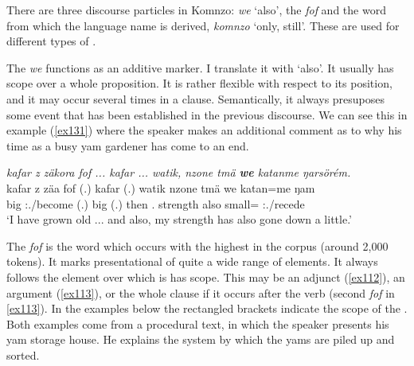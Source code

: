 There are three discourse particles in Komnzo: \emph{we} `also', the  \emph{fof} and the word from which the language name is derived, \emph{komnzo} `only, still'. These are used for different types of .%

The  \emph{we} functions as an additive  marker. I translate it with  `also'. It usually has scope over a whole proposition. It is rather flexible with respect to its position, and it may occur several times in a clause. Semantically, it always presuposes some event that has been established in the previous discourse. We can see this in example (\ref{ex131}) where the speaker makes an additional comment as to why his time as a busy yam gardener has come to an end.

\begin{exe}
	\ex \emph{kafar z zäkora fof ... kafar ... watik, nzone tmä \textbf{we} katanme ŋarsörém.}\\
	\gll kafar z zäa fof (.) kafar (.) watik nzone tmä we katan=me ŋam\\
	big \Iam{} \Fsg:\Pst.\Pfv/become \Emph{} (.) big (.) then \Fsg{}.\Poss{} strength also small=\Ins{} \Stsg:\Rpst.\Dur/recede\\
	\trans `I have grown old ... and also, my strength has also gone down a little.'\\
	\label{ex131}
\end{exe}

The  \emph{fof} is the word which occurs with the highest  in the corpus (around 2,000 tokens). It marks presentational  of quite a wide range of elements. It always follows the element over which is has scope. This may be an adjunct (\ref{ex112}), an argument (\ref{ex113}), or the whole clause if it occurs after the verb (second \emph{fof} in \ref{ex113}). In the examples below the rectangled brackets indicate the scope of the . Both examples come from a procedural text, in which the speaker presents his yam storage house. He explains the system by which the yams are piled up and sorted.

